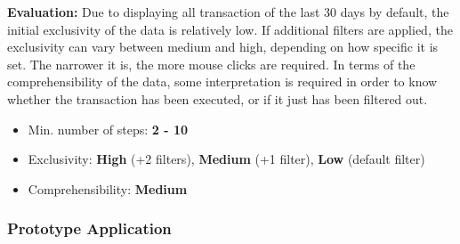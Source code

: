 \textbf{Evaluation:} Due to displaying all transaction of the last 30 days by default, the initial exclusivity of the data is relatively low. If additional filters are applied, the exclusivity can vary between medium and high, depending on how specific it is set. The narrower it is, the more mouse clicks are required. In terms of the comprehensibility of the data, some interpretation is required in order to know whether the transaction has been executed, or if it just has been filtered out.
\begin{itemize}[noitemsep,nolistsep]
	\item Min. number of steps: \textbf{2 - 10}
	\item Exclusivity: \textbf{High} (+2 filters), \textbf{Medium} (+1 filter), \textbf{Low} (default filter)
	\item Comprehensibility: \textbf{Medium}
\end{itemize}



\subsubsection{Prototype Application}

